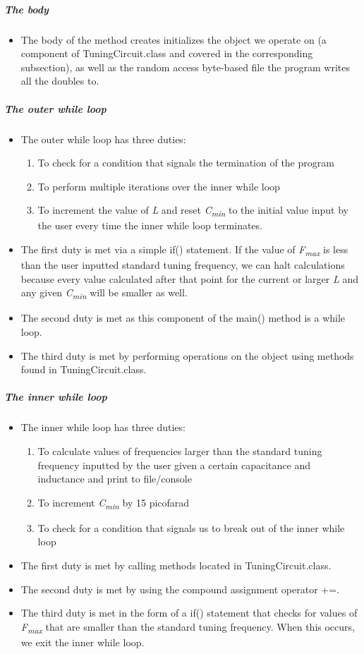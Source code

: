 \documentclass[12pt]{article}
\begin{document}
\subparagraph{The body}
\begin{itemize}[leftmargin=1.5em]
\item[] The body of the method creates initializes the object we operate on (a component of TuningCircuit.class and covered in the corresponding subsection), as well as the random access byte-based file the program writes all the doubles to.
\end{itemize}

\subparagraph{The outer while loop}
\begin{itemize}[leftmargin=1.5em]
\item[] The outer while loop has three duties:
\begin{enumerate}
\item To check for a condition that signals the termination of the program 
\item To perform multiple iterations over the inner while loop
\item To increment the value of \textit{L} and reset \textit{C\textsubscript{min}} to the initial value input by the user every time the inner while loop terminates.
\end{enumerate}
\item[] The first duty is met via a simple if() statement. If the value of \textit{F\textsubscript{max}} is less than the user inputted standard tuning frequency, we can halt calculations because every value calculated after that point for the current or larger \textit{L} and any given \textit{C\textsubscript{min}} will be smaller as well.
\item[] The second duty is met as this component of the main() method is a while loop.
\item[] The third duty is met by performing operations on the object using methods found in TuningCircuit.class.
\end{itemize}

\subparagraph{The inner while loop}
\begin{itemize}[leftmargin=1.5em]
\item[] The inner while loop has three duties:
\begin{enumerate}    
\item To calculate values of frequencies larger than the standard tuning frequency inputted by the user given a certain capacitance and inductance and print to file/console
\item To increment \textit{C\textsubscript{min}} by 15 picofarad
\item To check for a condition that signals us to break out of the inner while loop
\end{enumerate}
\item[] The first duty is met by calling methods located in TuningCircuit.class.
\item[] The second duty is met by using the compound assignment operator +=.
\item[] The third duty is met in the form of a if() statement that checks for values of  \textit{F\textsubscript{max}} that are smaller than the standard tuning frequency. When this occurs, we exit the inner while loop.
\end{itemize}
\end{document}

